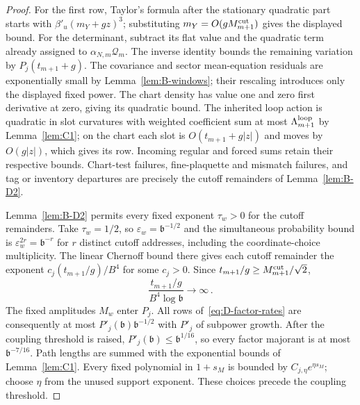 \begin{proof}
For the first row, Taylor's formula after the stationary quadratic part starts with $\beta'_u(m_Y+gz)^3$; substituting $m_Y=O(gM^{\mathrm{cut}}_{m+1})$ gives the displayed bound. For the determinant, subtract its flat value and the quadratic term already assigned to $\alpha_{N,m}\mathcal Q_m$. The inverse identity bounds the remaining variation by $P_j(t_{m+1}+g)$. The covariance and sector mean-equation residuals are exponentially small by Lemma~\ref{lem:B-windows}; their rescaling introduces only the displayed fixed power. The chart density has value one and zero first derivative at zero, giving its quadratic bound. The inherited loop action is quadratic in slot curvatures with weighted coefficient sum at most $\Lambda_{m+1}^{\rm loop}$ by Lemma~\ref{lem:C1}; on the chart each slot is $O(t_{m+1}+g|z|)$ and moves by $O(g|z|)$, which gives its row. Incoming regular and forced sums retain their respective bounds. Chart-test failures, fine-plaquette and mismatch failures, and tag or inventory departures are precisely the cutoff remainders of Lemma~\ref{lem:B-D2}.

Lemma~\ref{lem:B-D2} permits every fixed exponent $\tau_w>0$ for the cutoff remainders. Take $\tau_w=1/2$, so $\varepsilon_w=\mathfrak b^{-1/2}$ and the simultaneous probability bound is $\varepsilon_w^{2r}=\mathfrak b^{-r}$ for $r$ distinct cutoff addresses, including the coordinate-choice multiplicity. The linear Chernoff bound there gives each cutoff remainder the exponent $c_j(t_{m+1}/g)/B^4$ for some $c_j>0$. Since $t_{m+1}/g\ge M^{\mathrm{cut}}_{m+1}/\sqrt2$,
\begin{equation*}
\frac{t_{m+1}/g}{B^4\log\mathfrak b}\longrightarrow\infty\,.
\end{equation*}
The fixed amplitudes $M_w$ enter $P_j$. All rows of~\eqref{eq:D-factor-rates} are consequently at most $P'_j(\mathfrak b)\mathfrak b^{-1/2}$ with $P'_j$ of subpower growth. After the coupling threshold is raised, $P'_j(\mathfrak b)\le\mathfrak b^{1/16}$, so every factor majorant is at most $\mathfrak b^{-7/16}$. Path lengths are summed with the exponential bounds of Lemma~\ref{lem:C1}. Every fixed polynomial in $1+s_M$ is bounded by $C_{j,\eta}e^{\eta s_M}$; choose $\eta$ from the unused support exponent. These choices precede the coupling threshold.


\end{proof}
